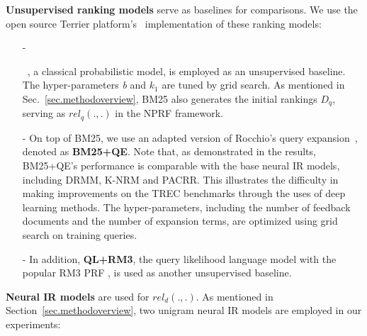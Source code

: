 \documentclass[11pt,a4paper]{article}
\begin{document}
\noindent\textbf{Unsupervised ranking models} serve as baselines for comparisons. We use the open source Terrier platform's~\cite{terrier12osir} implementation of these ranking models:

\begin{itemize}[leftmargin=*]
\item[-] 

~\cite{DBLP:conf/trec/RobertsonWHGP95}, a classical probabilistic model, is employed as an unsupervised baseline. The hyper-parameters {\em b} and {\em $k_1$} are tuned by grid search. As mentioned in Sec.~\ref{sec.methodoverview}, BM25 also generates the initial rankings $D_q$, serving as $rel_q(.,.)$ in the NPRF framework.

\item[-] 
\noindent On top of BM25, we use an adapted version of Rocchio's query expansion~\cite{DBLP:conf/trec/YeHHYL09}, denoted as {\bf BM25+QE}. 
Note that, as demonstrated in the results, BM25+QE's performance is comparable with the base neural IR models, including DRMM, K-NRM and PACRR. This illustrates
the difficulty in making improvements on the TREC benchmarks
through the uses of deep learning methods.
The hyper-parameters, including
the number of feedback documents and the number of expansion terms, are optimized using grid search on training queries.

\item[-] 
\noindent In addition, {\bf QL+RM3}, the query likelihood language model with the popular RM3 PRF \cite{DBLP:conf/sigir/LavrenkoC01}, is used as another unsupervised baseline.

\end{itemize}

\noindent\textbf{Neural IR models} are used for $rel_d(.,.)$. As mentioned in Section~\ref{sec.methodoverview},
two unigram neural IR models are employed in our experiments:
\end{document}
